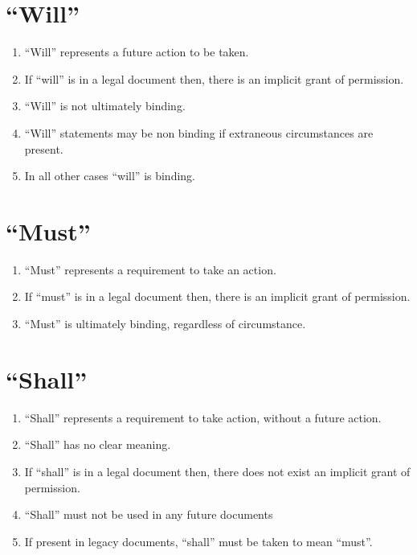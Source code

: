\documentclass[12pt, letterpaper]{report}
\begin{document}
\begin{linenumbers}
    	\section{``Will''}
    	    \begin{enumerate}
            \renewcommand{\labelenumi}{\bfseries\alph{enumi})}
                \item   ``Will'' represents a future action to be taken.
                \item	If ``will'' is in a legal document then, there is an implicit grant of permission.
            	\item	``Will'' is not ultimately binding.
            	\item	``Will'' statements may be non binding if extraneous circumstances are present.
            	\item	In all other cases ``will'' is binding.        
            \end{enumerate}
    	\section{``Must''}
    		    \begin{enumerate}
                 \renewcommand{\labelenumi}{\bfseries\alph{enumi})}
    	           \item ``Must'' represents a requirement to take an action.
                   \item  If ``must'' is in a legal document then, there is an implicit grant of permission.
                   \item ``Must'' is ultimately binding, regardless of circumstance.
            \end{enumerate}
        \section{``Shall''}
            \begin{enumerate}
            \renewcommand{\labelenumi}{\bfseries\alph{enumi})}
            	\item``Shall'' represents a requirement to take action, without a future action.
            	\item  ``Shall'' has no clear meaning.
            	\item If ``shall'' is in a legal document then, there does not exist an implicit grant of permission.
            	\item ``Shall'' must not be used in any future documents
            	\item If present in legacy documents, ``shall'' must be taken to mean ``must''.
            \end{enumerate}

\end{linenumbers}
\end{document}

